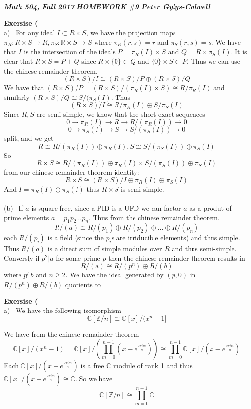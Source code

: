 \documentclass[12pt]{article}
\newenvironment{ques}[1]{\textbf{Exersise #1}\vspace{1 mm}\\ }{\bigskip}
\theoremstyle{definition}
\renewcommand{\l}{\left }
\renewcommand{\r}{\right }
\newcommand{\R}{\mathbb R}
\newcommand{\Z}{\mathbb Z}
\newcommand{\C}{\mathbb C}
\begin{document}
\noindent \textit{\textbf{Math 504, Fall 2017}} \hspace{1.3cm}
\textit{\textbf{HOMEWORK $\#$9}} \hspace{1.3cm} \textit{\textbf{Peter
Gylys-Colwell}} 

\vspace{1cm}

\begin{ques}{9.1}
	(a) \ For any ideal $I \subset R \times S$, we have the projection maps
	$\pi_R:R\times S \to R, \pi_S: \R \times S \to S$ where $\pi_R(r,s) = r$
	and $\pi_S(r,s) = s$. We have that $I$ is the intersection of the ideals $P
	= \pi_R(I) \times S$ and $Q = R \times \pi_S(I)$. It is clear that $R
	\times S = P + Q$ since $R \times \{0\} \subset Q$ and $\{0\} \times S
	\subset P$. Thus we can use the chinese remainder theorem.
	$$(R \times S)/I \cong (R \times S) / P \oplus (R \times S)/ Q$$
	We have that $(R \times S)/ P = (R \times S) / (\pi_R(I) \times S) \cong R
	/ \pi_R(I)$ and similarly $(R \times S)/Q \cong S/(\pi_S(I)$. Thus
	$$(R \times S)/I \cong R/\pi_R(I) \oplus S/\pi_S(I)$$
	Since $R, S$ are semi-simple, we know that the short exact sequences
	$$0 \to \pi_R(I) \to R \to R/(\pi_R(I)) \to 0$$
	$$0 \to \pi_S(I) \to S \to S/(\pi_S(I)) \to 0$$
	split, and we get
	$$R \cong R/(\pi_R(I)) \oplus \pi_R(I), S \cong  S/(\pi_S(I)) \oplus \pi_S(I)$$
	So
	$$R \times S \cong R/(\pi_R(I)) \oplus \pi_R(I) \times S/(\pi_S(I)) \oplus
	\pi_S(I)$$
	from our chinese remainder theorem identity:
	$$R \times S \cong (R \times S)/I \oplus \pi_R(I) \oplus \pi_S(I)$$
	And $I =  \pi_R(I) \oplus \pi_S(I)$ thus $R \times
	S$ is semi-simple.\\
	\\
	(b) \ If $a$ is square free, since a PID is a UFD we can factor $a$ as a
	produt of prime elements $a = p_1p_2 \dots p_n$. Thus from the chinese
	remainder theorem.
	$$R/(a) \cong R/(p_1) \oplus R/(p_2) \oplus \dots \oplus R/(p_n)$$
	each $R/(p_i)$ is a field (since the $p_i$s are irriducible elements) and
	thus simple. Thus $R/(a)$ is a direct sum of simple modules over $R$ and
	thus semi-simple.\\
	Conversly if $p^2 | a$ for some prime $p$ then the chinese remainder
	theorem results in
	$$R/(a) \cong R/(p^n) \oplus R/(b)$$
	where $p \not | \ b$ and $n \geq 2$. We have the ideal generated by $(p,0)$
	in $R/(p^n) \oplus R/(b)$ quotients to 
\end{ques}

\begin{ques}{9.2}
	(a) \ We have the following isomorphism
	$$\C[\Z/n] \cong \C[x]/(x^n - 1]$$

	We have from the chinese remainder theorem 
	$$\C[x]/(x^n - 1) = \C[x]/\l(\prod_{m=0}^{n-1} (x - e^{\frac{2\pi im}{n}})
	\r) \cong \prod_{m=0}^{n-1} \C[x]/ (x - e^{\frac{2\pi im}{n}})$$
	Each $\C[x]/ (x - e^{\frac{2\pi im}{n}})$ is a free $\C$ module of rank 1
	and thus $\C[x]/ (x - e^{\frac{2\pi im}{n}}) \cong \C$. So we have 
	$$\C[\Z/n] \cong \prod_{m=0}^{n-1} \C$$
\end{ques}
\end{document}
